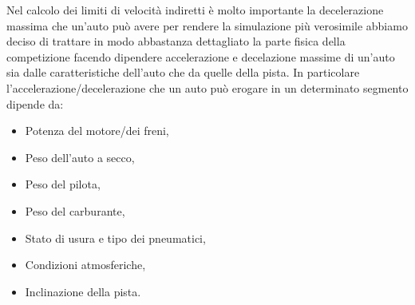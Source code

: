 \documentclass[11pt,a4paper]{report}
\begin{document}
Nel calcolo dei limiti di velocità indiretti è molto importante la decelerazione massima che un'auto può avere per rendere la simulazione più verosimile abbiamo deciso di trattare in modo abbastanza dettagliato la parte fisica della competizione facendo dipendere accelerazione e decelazione massime di un'auto sia dalle caratteristiche dell'auto che da quelle della pista.
In particolare l'accelerazione/decelerazione che un auto può erogare in un determinato segmento dipende da:
\begin{itemize}
\item Potenza del motore/dei freni,
\item Peso dell'auto a secco,
\item Peso del pilota,
\item Peso del carburante,
\item Stato di usura e tipo dei pneumatici,
\item Condizioni atmosferiche,
\item Inclinazione della pista.
\end{itemize}
\end{document}
